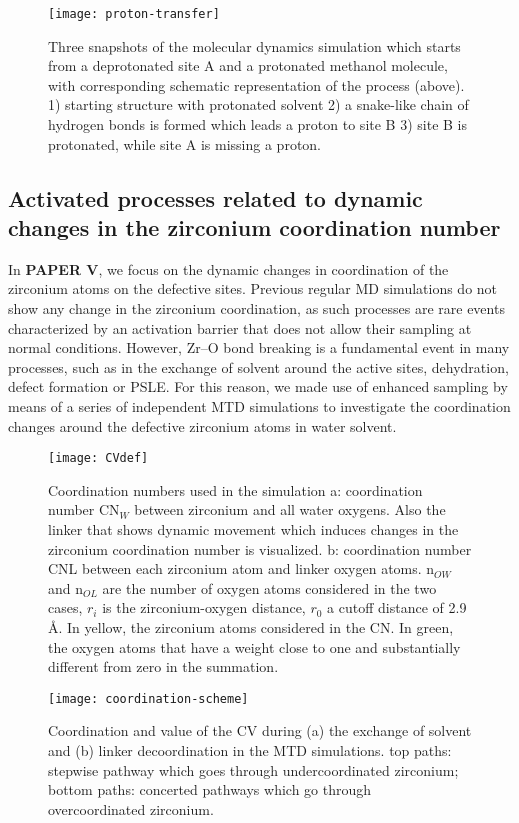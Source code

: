 \begin{figure}[!htbp]
	\centering
	\texttt{[image: proton-transfer]}
	\caption{Three snapshots of the molecular dynamics simulation which starts from a deprotonated site A and a protonated methanol molecule, with corresponding schematic representation of the process (above). 1) starting structure with protonated solvent 2) a snake-like chain of hydrogen bonds is formed which leads a proton to site B 3) site B is protonated, while site A is missing a proton.}
	\label{fig:proton-transfer}
\end{figure}

\subsection*{Activated processes related to dynamic changes in the zirconium coordination number}
In \textbf{PAPER V}, we focus on the dynamic changes in coordination of the zirconium atoms on the defective sites. Previous regular MD simulations do not show any change in the zirconium coordination, as such processes are rare events characterized by an activation barrier that does not allow their sampling at normal conditions. However, Zr--O bond breaking is a fundamental event in many processes, such as in the exchange of solvent around the active sites, dehydration, defect formation or PSLE. For this reason, we made use of enhanced sampling by means of a series of independent MTD simulations to investigate the coordination changes around the defective zirconium atoms in water solvent. 
\npar
\begin{figure}[!htbp]
	\centering
	\texttt{[image: CVdef]}
	\caption{Coordination numbers used in the simulation a: coordination number CN$_W$ between zirconium and all water oxygens. Also the linker that shows dynamic movement which induces changes in the zirconium coordination number is visualized. b: coordination number CNL between each zirconium atom  and linker oxygen atoms. n$_{OW}$ and n$_{OL}$ are the number of oxygen atoms considered in the two cases, $r_i$ is the zirconium-oxygen distance, $r_0$ a cutoff distance of 2.9 \AA. In yellow, the zirconium atoms considered in the CN. In green, the oxygen atoms that have a weight close to one and substantially different from zero in the summation.}
	\label{fig:CVdef}
\end{figure}
\begin{figure}[!htbp]
	\centering
	\texttt{[image: coordination-scheme]}
	\caption{ Coordination and value of the CV during (a) the exchange of solvent and (b) linker decoordination in the MTD simulations. top paths: stepwise pathway which goes through undercoordinated zirconium; bottom paths: concerted pathways which go through overcoordinated zirconium.}
	\label{fig:coordination-scheme}
\end{figure}
